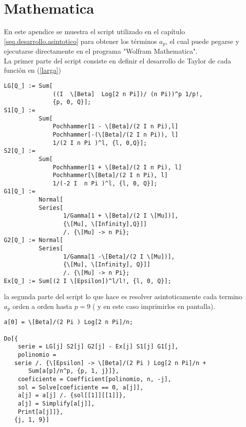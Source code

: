 \chapter{Mathematica}\label{Apendice.1}

En este apendice se muestra el script utilizado en el capítulo \ref{seq.desarrollo.asintotico} para obtener los términos $a _p$, el cual puede pegarse y ejecutarse directamente en el programa "Wolfram Mathematica".\\



La primer parte del script consiste en definir el desarrollo de Taylor de cada función  en (\ref{larga})
\begin{verbatim}
LG[Q_] := Sum[
              ((I  \[Beta]  Log[2 n Pi])/ (n Pi))^p 1/p!, 
              {p, 0, Q}];
S1[Q_] := 
          Sum[
              Pochhammer[1 - \[Beta]/(2 I n Pi),l] 
              Pochhammer[-(\[Beta]/(2 I n Pi)), l] 
              1/(2 I n Pi )^l, {l, 0,Q}];
S2[Q_] := 
          Sum[
              Pochhammer[1 + \[Beta]/(2 I n Pi), l] 
              Pochhammer[\[Beta]/(2 I n Pi), l] 
              1/(-2 I  n Pi )^l, {l, 0, Q}];
G1[Q_] := 
          Normal[
          Series[
                 1/Gamma[1 + \[Beta]/(2 I \[Mu])], 
                 {\[Mu], \[Infinity],Q}]] 
                 /. {\[Mu] -> n Pi};
G2[Q_] := Normal[
          Series[
                 1/Gamma[1 -\[Beta]/(2 I \[Mu])], 
                 {\[Mu], \[Infinity], Q}]] 
                 /. {\[Mu] -> n Pi};
Ex[Q_] := Sum[(2 I \[Epsilon])^l/l!, {l, 0, Q}];
\end{verbatim}
la segunda parte del script lo que hace es resolver asintoticamente cada termino $a_p$ orden a orden hasta $p=9$ ( y en este caso imprimirlos en pantalla).
\begin{verbatim}
a[0] = \[Beta]/(2 Pi ) Log[2 n Pi]/n;

Do[{
  	serie = LG[j] S2[j] G2[j] - Ex[j] S1[j] G1[j],
  	polinomio = 
   serie /. {\[Epsilon] -> \[Beta]/(2 Pi ) Log[2 n Pi]/n + 
       Sum[a[p]/n^p, {p, 1, j}]},
  	coeficiente = Coefficient[polinomio, n, -j],
  	sol = Solve[coeficiente == 0, a[j]],
  	a[j] = a[j] /. {sol[[1]][[1]]},
  	a[j] = Simplify[a[j]],
  	Print[a[j]]},
   {j, 1, 9}]
\end{verbatim}